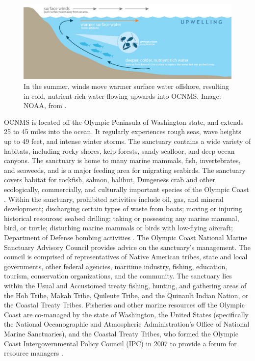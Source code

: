 \documentclass[12pt,twoside]{reedthesis}
\begin{document}
\begin{figure}[htbp]
	\begin{center}
		\includegraphics[scale=0.4]{Fig_NOAA_Upwelling}
		\caption[Upwelling]{\footnotesize{In the summer, winds move warmer surface water offshore, resulting in cold, nutrient-rich water flowing upwards into OCNMS. Image: NOAA, from \autocite{OceanographyOlympicCoast}.}} %
	\end{center}
	\label{Upwelling}
\end{figure} 

OCNMS is located off the Olympic Peninsula of Washington state, and extends 25 to 45 miles into the ocean. It regularly experiences rough seas, wave heights up to 49 feet, and intense winter storms. The sanctuary contains a wide variety of habitats, including rocky shores, kelp forests, sandy seafloor, and deep ocean canyons. The sanctuary is home to many marine mammals, fish, invertebrates, and seaweeds, and is a major feeding area for migrating seabirds. The sanctuary covers habitat for rockfish, salmon, halibut, Dungeness crab and other ecologically, commercially, and culturally important species of the Olympic Coast \autocite{FishOlympicCoast}.  Within the sanctuary, prohibited activities include oil, gas, and mineral development; discharging certain types of waste from boats; moving or injuring historical resources; seabed drilling; taking or possessing any marine mammal, bird, or turtle; disturbing marine mammals or birds with low-flying aircraft; Department of Defense bombing activities \autocite{15CFRPart}. The Olympic Coast National Marine Sanctuary Advisory Council provides advice on the sanctuary's management. The council is comprised of representatives of Native American tribes, state and local governments, other federal agencies, maritime industry, fishing, education, tourism, conservation organizations, and the community. The sanctuary lies within the Usual and Accustomed treaty fishing, hunting, and gathering areas of the Hoh Tribe, Makah Tribe, Quileute Tribe, and the Quinault Indian Nation, or the Coastal Treaty Tribes. Fisheries and other marine resources off the Olympic Coast are co-managed by the state of Washington, the United States (specifically the National Oceanographic and Atmospheric Administration's Office of National Marine Sanctuaries), and the Coastal Treaty Tribes, who formed the Olympic Coast Intergovernmental Policy Council (IPC) in 2007 to provide a forum for resource managers \autocite{IntergovernmentalPolicyCouncil}.
\end{document}
